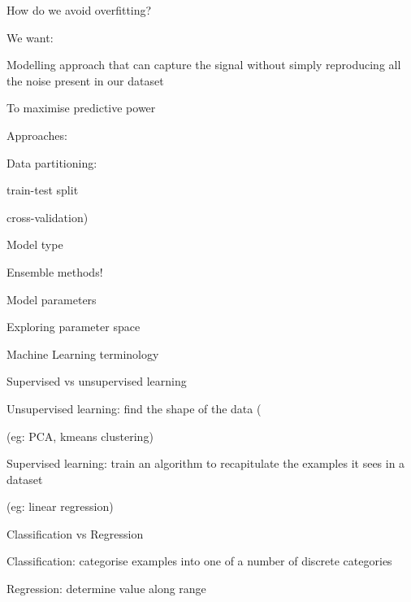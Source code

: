 \documentclass[ignorenonframetext,]{beamer}
\begin{document}
\begin{frame}{How do we avoid overfitting?}

\begin{block}{We want:}

Modelling approach that can capture the signal without simply
reproducing all the noise present in our dataset

To maximise predictive power

\end{block}

\begin{block}{Approaches:}

\begin{block}{Data partitioning:}

train-test split

cross-validation)

\end{block}

\begin{block}{Model type}

Ensemble methods!

\end{block}

\begin{block}{Model parameters}

Exploring parameter space

\end{block}

\end{block}

\end{frame}

\begin{frame}{Machine Learning terminology}

\begin{block}{Supervised vs unsupervised learning}

Unsupervised learning: find the shape of the data (

(eg: PCA, kmeans clustering)

Supervised learning: train an algorithm to recapitulate the examples it
sees in a dataset

(eg: linear regression)

\end{block}

\begin{block}{Classification vs Regression}

Classification: categorise examples into one of a number of discrete
categories

Regression: determine value along range

\end{block}

\end{frame}
\end{document}
